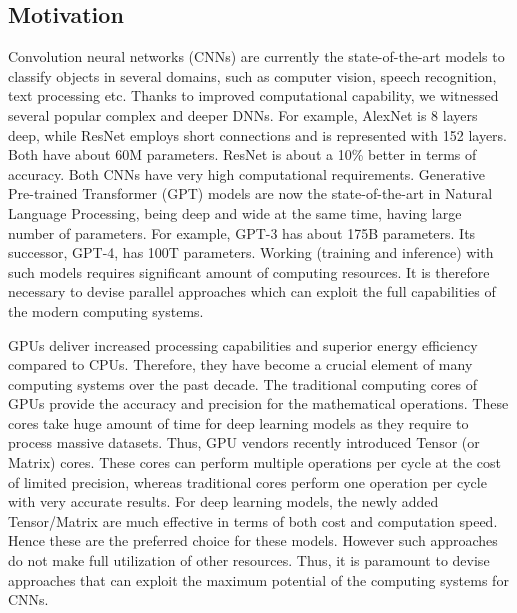 \subsection*{Motivation}

Convolution neural networks  (CNNs) are currently the state-of-the-art models to classify objects in several domains, such as computer vision, speech recognition, text processing etc. Thanks to improved computational capability, we witnessed several popular complex and deeper DNNs. For example, AlexNet is 8 layers deep, while ResNet employs short connections and is represented with 152 layers. Both have about 60M parameters. ResNet is about a 10\% better in terms of accuracy. Both CNNs have very high computational requirements. Generative Pre-trained Transformer (GPT) models are now the state-of-the-art in Natural Language Processing, being deep and wide at the same time, having large number of parameters. For  example, GPT-3 has about 175B parameters. Its successor, GPT-4, has 100T parameters. Working (training and inference) with such models requires significant amount of computing resources. It is therefore necessary to devise parallel approaches which can exploit the full capabilities of the modern computing systems.    


GPUs deliver increased processing capabilities and superior energy efficiency compared to CPUs. Therefore, they have become a crucial element of many computing systems over the past decade. The traditional computing cores of GPUs provide the accuracy and precision for the mathematical operations. These cores take huge amount of time for deep learning models as they require to process massive datasets. Thus, GPU vendors recently introduced Tensor (or Matrix) cores. These cores can perform multiple operations per cycle at the cost of limited precision, whereas traditional cores perform one operation per cycle with very accurate results. For deep learning models, the newly added Tensor/Matrix are much effective in terms of both cost and computation speed. Hence these are the preferred choice for these models. However such approaches do not make full utilization of other resources. Thus, it is paramount to devise approaches that can exploit the maximum potential of the computing systems for CNNs.



